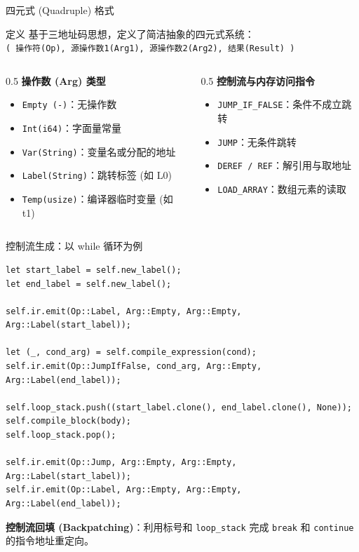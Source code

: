 \documentclass[aspectratio=169]{ctexbeamer}
\begin{document}
\begin{frame}{四元式 (Quadruple) 格式}
    \begin{block}{定义}
        基于三地址码思想，定义了简洁抽象的四元式系统：\\
        \texttt{( 操作符(Op), 源操作数1(Arg1), 源操作数2(Arg2), 结果(Result) )}
    \end{block}
    \vfill
    \begin{columns}[T]
    \begin{column}{0.5\textwidth}
        \textbf{操作数 (Arg) 类型}
        \begin{itemize}
            \item \texttt{Empty (-)}：无操作数
            \item \texttt{Int(i64)}：字面量常量
            \item \texttt{Var(String)}：变量名或分配的地址
            \item \texttt{Label(String)}：跳转标签 (如 L0)
            \item \texttt{Temp(usize)}：编译器临时变量 (如 t1)
        \end{itemize}
    \end{column}
    \begin{column}{0.5\textwidth}
        \textbf{控制流与内存访问指令}
        \begin{itemize}
            \item \texttt{JUMP\_IF\_FALSE}：条件不成立跳转
            \item \texttt{JUMP}：无条件跳转
            \item \texttt{DEREF / REF}：解引用与取地址
            \item \texttt{LOAD\_ARRAY}：数组元素的读取
        \end{itemize}
    \end{column}
    \end{columns}
\end{frame}

\begin{frame}[fragile]{控制流生成：以 while 循环为例}
    \begin{lstlisting}[language=RustLike, basicstyle=\tiny\ttfamily]
let start_label = self.new_label();
let end_label = self.new_label();

self.ir.emit(Op::Label, Arg::Empty, Arg::Empty, Arg::Label(start_label));

let (_, cond_arg) = self.compile_expression(cond);
self.ir.emit(Op::JumpIfFalse, cond_arg, Arg::Empty, Arg::Label(end_label));

self.loop_stack.push((start_label.clone(), end_label.clone(), None));
self.compile_block(body);
self.loop_stack.pop();

self.ir.emit(Op::Jump, Arg::Empty, Arg::Empty, Arg::Label(start_label));
self.ir.emit(Op::Label, Arg::Empty, Arg::Empty, Arg::Label(end_label));
    \end{lstlisting}
    \textbf{控制流回填 (Backpatching)}：利用标号和 \texttt{loop\_stack} 完成 \texttt{break} 和 \texttt{continue} 的指令地址重定向。
\end{frame}
\end{document}
